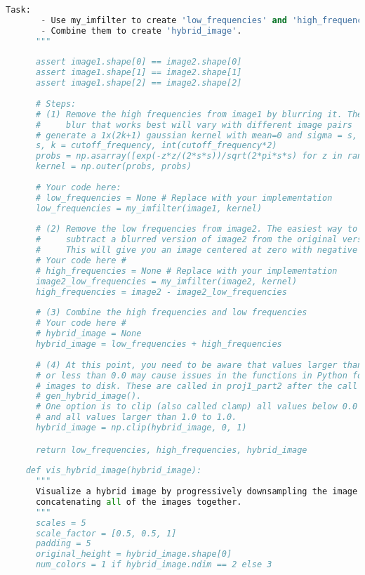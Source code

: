 \begin{lstlisting}[caption={student.py}, label={lst:code-example}, captionpos=t, language=python]
       Task:
       - Use my_imfilter to create 'low_frequencies' and 'high_frequencies'.
       - Combine them to create 'hybrid_image'.
      """
    
      assert image1.shape[0] == image2.shape[0]
      assert image1.shape[1] == image2.shape[1]
      assert image1.shape[2] == image2.shape[2]
    
      # Steps:
      # (1) Remove the high frequencies from image1 by blurring it. The amount of
      #     blur that works best will vary with different image pairs
      # generate a 1x(2k+1) gaussian kernel with mean=0 and sigma = s, see https://stackoverflow.com/questions/17190649/how-to-obtain-a-gaussian-filter-in-python
      s, k = cutoff_frequency, int(cutoff_frequency*2)
      probs = np.asarray([exp(-z*z/(2*s*s))/sqrt(2*pi*s*s) for z in range(-k,k+1)], dtype=np.float32)
      kernel = np.outer(probs, probs)
      
      # Your code here:
      # low_frequencies = None # Replace with your implementation
      low_frequencies = my_imfilter(image1, kernel)
    
      # (2) Remove the low frequencies from image2. The easiest way to do this is to
      #     subtract a blurred version of image2 from the original version of image2.
      #     This will give you an image centered at zero with negative values.
      # Your code here #
      # high_frequencies = None # Replace with your implementation
      image2_low_frequencies = my_imfilter(image2, kernel)
      high_frequencies = image2 - image2_low_frequencies
    
      # (3) Combine the high frequencies and low frequencies
      # Your code here #
      # hybrid_image = None
      hybrid_image = low_frequencies + high_frequencies
    
      # (4) At this point, you need to be aware that values larger than 1.0
      # or less than 0.0 may cause issues in the functions in Python for saving
      # images to disk. These are called in proj1_part2 after the call to 
      # gen_hybrid_image().
      # One option is to clip (also called clamp) all values below 0.0 to 0.0, 
      # and all values larger than 1.0 to 1.0.
      hybrid_image = np.clip(hybrid_image, 0, 1)

      return low_frequencies, high_frequencies, hybrid_image
    
    def vis_hybrid_image(hybrid_image):
      """
      Visualize a hybrid image by progressively downsampling the image and
      concatenating all of the images together.
      """
      scales = 5
      scale_factor = [0.5, 0.5, 1]
      padding = 5
      original_height = hybrid_image.shape[0]
      num_colors = 1 if hybrid_image.ndim == 2 else 3
    

\end{lstlisting}
